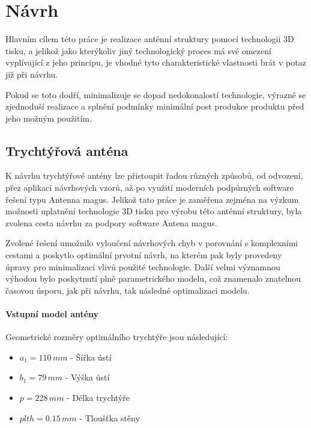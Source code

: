 \chapter{Návrh}
Hlavním cílem této práce je realizace anténní struktury pomocí technologii 3D tisku, a jelikož jako kterýkoliv jiný technologický proces má své omezení vyplívající z jeho principu, je vhodné tyto charakteristické vlastnosti brát v potaz již při návrhu.

Pokud se toto dodří, minimalizuje se dopad nedokonalostí technologie, výrazně se zjednoduší realizace a splnění podmínky minimální post produkce produktu před jeho možným použitím.

\section{Trychtýřová anténa}
K návrhu trychtýřové antény lze přistoupit řadou různých způsobů, od odvození, přez aplikaci návrhových vzorů, až po využití moderních podpůrných software řešení typu Antenna magus. Jelikož tato práce je zaměřena zejména na výzkum možnosti uplatnění technologie 3D tisku pro výrobu této anténní struktury, byla zvolena cesta návrhu za podpory software Antena magus.

Zvolené řešení umožnilo vyloučení návrhových chyb v porovnání s komplexními cestami a poskytlo optimální prvotní návrh, na kterém pak byly provedeny úpravy pro minimalizaci vlivů použité technologie. Další velmi významnou výhodou bylo poskytnutí plně parametrického modelu, což znamenalo znatelnou časovou úsporu, jak při návrhu, tak následné optimalizaci modelu.
\subsubsection{Vstupní model antény}
Geometrické rozměry optimálního trychtýře jsou následující:
\begin{itemize}
\item $a_1 = 110\,mm$ - Šířka ústí
\item $b_1 = 79\,mm$ - Výška ústí
\item $p = 228\,mm$ - Délka trychtýře
\item $plth = 0.15\,mm$ - Tloušťka stěny
\end{itemize}


